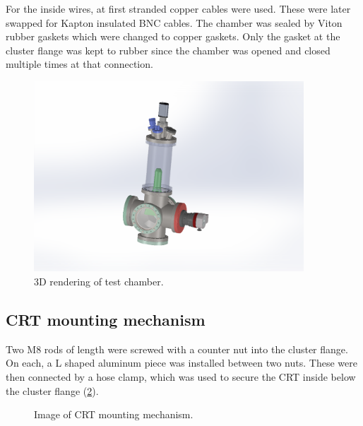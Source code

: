 For the inside wires, at first stranded copper cables were used. These were later swapped for Kapton insulated BNC cables. The chamber was sealed by Viton rubber gaskets which were changed to copper gaskets. Only the gasket at the cluster flange was kept to rubber since the chamber was opened and closed multiple times at that connection.
 
\begin{figure}[ht]
	\centering
 	
	\includegraphics[width=0.9\textwidth]{./Chapters/vacuum-chamber/test_chamber} %
	
	\caption{3D rendering of test chamber.}
	\label{fig:3D rendering of test chamber}
\end{figure}
 
\subsection{CRT mounting mechanism}
\label{subsec:CRT mounting mechanism}

Two M8 rods of length  were screwed with a counter nut into the cluster flange. On each, a L shaped aluminum piece was installed between two nuts. These were then connected by a hose clamp, which was used to secure the CRT inside below the cluster flange (\cref{fig:Image of CRT mounting mechanism}).
 

\begin{figure}[h]
	\centering
	
	
	\caption{Image of CRT mounting mechanism.}
	\label{fig:Image of CRT mounting mechanism}
\end{figure}


